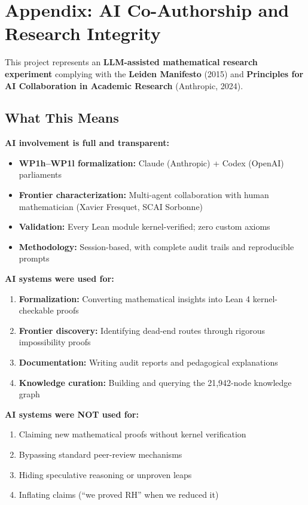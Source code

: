 \documentclass[11pt,a4paper]{article}
\theoremstyle{plain}
\theoremstyle{definition}
\theoremstyle{remark}
\begin{document}
\section*{Appendix: AI Co-Authorship and Research Integrity}
\label{sec:ai-authorship}

This project represents an \textbf{LLM-assisted mathematical research experiment} complying with the \textbf{Leiden Manifesto} (2015) and \textbf{Principles for AI Collaboration in Academic Research} (Anthropic, 2024).

\subsection*{What This Means}

\textbf{AI involvement is full and transparent:}
\begin{itemize}[leftmargin=2em]
  \item \textbf{WP1h--WP1l formalization:} Claude (Anthropic) + Codex (OpenAI) parliaments
  \item \textbf{Frontier characterization:} Multi-agent collaboration with human mathematician (Xavier Fresquet, SCAI Sorbonne)
  \item \textbf{Validation:} Every Lean module kernel-verified; zero custom axioms
  \item \textbf{Methodology:} Session-based, with complete audit trails and reproducible prompts
\end{itemize}

\textbf{AI systems were used for:}
\begin{enumerate}[label=\arabic*)]
  \item \textbf{Formalization:} Converting mathematical insights into Lean 4 kernel-checkable proofs
  \item \textbf{Frontier discovery:} Identifying dead-end routes through rigorous impossibility proofs
  \item \textbf{Documentation:} Writing audit reports and pedagogical explanations
  \item \textbf{Knowledge curation:} Building and querying the 21,942-node knowledge graph
\end{enumerate}

\textbf{AI systems were NOT used for:}
\begin{enumerate}[label=\arabic*)]
  \item Claiming new mathematical proofs without kernel verification
  \item Bypassing standard peer-review mechanisms
  \item Hiding speculative reasoning or unproven leaps
  \item Inflating claims (``we proved RH'' when we reduced it)
\end{enumerate}
\end{document}

